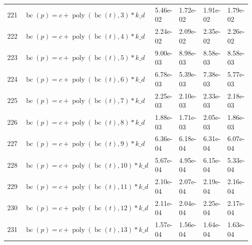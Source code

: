 \documentclass[12pt,a4paper]{article}
\DeclareMathOperator{\bc}{bc}
\DeclareMathOperator{\poly}{poly}
\begin{document}
\begin{longtable}[t]{ll>{\raggedleft\arraybackslash}p{2cm}>{\raggedleft\arraybackslash}p{2cm}>{\raggedleft\arraybackslash}p{2cm}>{\raggedleft\arraybackslash}p{2cm}}
\rowcolor{gray!6}  221 & $\bc(p) = c + \poly\left( \bc(t), 3 \right) * k\_d$ & 5.46e-02 & 1.72e-02 & 1.91e-02 & 1.79e-02\\
222 & $\bc(p) = c + \poly\left( \bc(t), 4 \right) * k\_d$ & 2.24e-02 & 2.09e-02 & 2.35e-02 & 2.26e-02\\
\rowcolor{gray!6}  223 & $\bc(p) = c + \poly\left( \bc(t), 5 \right) * k\_d$ & 9.00e-03 & 8.98e-03 & 8.58e-03 & 8.58e-03\\
224 & $\bc(p) = c + \poly\left( \bc(t), 6 \right) * k\_d$ & 6.78e-03 & 5.39e-03 & 7.38e-03 & 5.77e-03\\
\rowcolor{gray!6}  225 & $\bc(p) = c + \poly\left( \bc(t), 7 \right) * k\_d$ & 2.25e-03 & 2.10e-03 & 2.33e-03 & 2.18e-03\\
226 & $\bc(p) = c + \poly\left( \bc(t), 8 \right) * k\_d$ & 1.88e-03 & 1.71e-03 & 2.05e-03 & 1.86e-03\\
\rowcolor{gray!6}  227 & $\bc(p) = c + \poly\left( \bc(t), 9 \right) * k\_d$ & 6.36e-04 & 6.18e-04 & 6.31e-04 & 6.07e-04\\
228 & $\bc(p) = c + \poly\left( \bc(t), 10 \right) * k\_d$ & 5.67e-04 & 4.95e-04 & 6.15e-04 & 5.33e-04\\
\rowcolor{gray!6}  229 & $\bc(p) = c + \poly\left( \bc(t), 11 \right) * k\_d$ & 2.10e-04 & 2.07e-04 & 2.19e-04 & 2.16e-04\\
230 & $\bc(p) = c + \poly\left( \bc(t), 12 \right) * k\_d$ & 2.11e-04 & 2.04e-04 & 2.25e-04 & 2.17e-04\\
\rowcolor{gray!6}  231 & $\bc(p) = c + \poly\left( \bc(t), 13 \right) * k\_d$ & 1.57e-04 & 1.56e-04 & 1.64e-04 & 1.63e-04\\*
\end{longtable}
\endgroup{}

\begingroup\fontsize{10}{12}\selectfont
\end{document}
